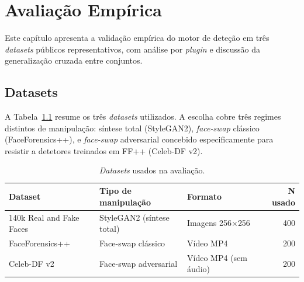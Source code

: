 %
%
%

\chapter{Avaliação Empírica}
\label{ch:benchmarks}

Este capítulo apresenta a validação empírica do motor de deteção em três
\emph{datasets} públicos representativos, com análise por \emph{plugin} e
discussão da generalização cruzada entre conjuntos.

\section{Datasets}
\label{sec:bench:datasets}

A Tabela~\ref{tab:bench:datasets} resume os três \emph{datasets} utilizados.
A escolha cobre três regimes distintos de manipulação: síntese total
(StyleGAN2), \emph{face-swap} clássico (FaceForensics++), e \emph{face-swap}
adversarial concebido especificamente para resistir a detetores treinados em
FF++ (Celeb-DF v2).

\begin{table}[ht]
\centering
\caption{\emph{Datasets} usados na avaliação.}
\label{tab:bench:datasets}
\small
\begin{tabular}{lllr}
\toprule
\textbf{Dataset} & \textbf{Tipo de manipulação} & \textbf{Formato} & \textbf{N usado} \\
\midrule
140k Real and Fake Faces & StyleGAN2 (síntese total) & Imagens 256$\times$256 & 400 \\
FaceForensics++          & Face-swap clássico         & Vídeo MP4              & 200 \\
Celeb-DF v2              & Face-swap adversarial      & Vídeo MP4 (sem áudio)  & 200 \\
\bottomrule
\end{tabular}
\end{table}

